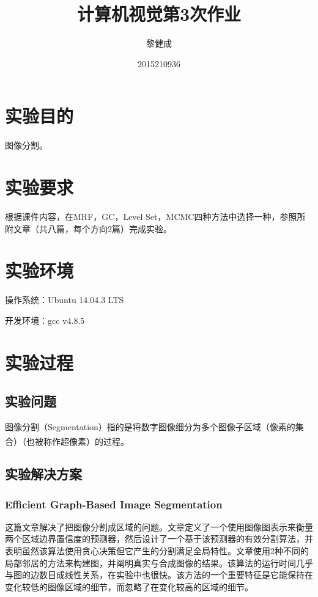 \documentclass[a4paper, 12pt, UTF8]{article}
\begin{document}
\title{计算机视觉第3次作业}
\author{黎健成}
\date{2015210936}
\maketitle

\section{实验目的}

图像分割。


\section{实验要求}

根据课件内容，在MRF，GC，Level Set，MCMC四种方法中选择一种，参照所附文章（共八篇，每个方向2篇）完成实验。


\section{实验环境}

操作系统：Ubuntu 14.04.3 LTS

开发环境：gcc v4.8.5


\section{实验过程}

\subsection{实验问题}

图像分割（Segmentation）指的是将数字图像细分为多个图像子区域（像素的集合）（也被称作超像素）的过程\textsuperscript{\cite{ref1}}。


\subsection{实验解决方案}

\subsubsection{Efficient Graph-Based Image Segmentation}

这篇文章解决了把图像分割成区域的问题。文章定义了一个使用图像图表示来衡量两个区域边界置信度的预测器，然后设计了一个基于该预测器的有效分割算法，并表明虽然该算法使用贪心决策但它产生的分割满足全局特性。文章使用2种不同的局部邻居的方法来构建图，并阐明真实与合成图像的结果。该算法的运行时间几乎与图的边数目成线性关系，在实验中也很快。该方法的一个重要特征是它能保持在变化较低的图像区域的细节，而忽略了在变化较高的区域的细节。
\end{document}
